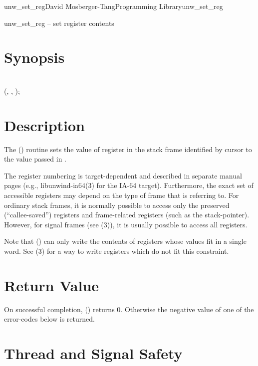\documentclass{article}
\begin{document}
\begin{Name}{3}{unw\_set\_reg}{David Mosberger-Tang}{Programming Library}{unw\_set\_reg}

  unw\_set\_reg -- set register contents
\end{Name}

\section{Synopsis}

\\

 (,  ,  );\\

\section{Description}

The () routine sets the value of register
 in the stack frame identified by cursor  to the
value passed in .

The register numbering is target-dependent and described in separate
manual pages (e.g., libunwind-ia64(3) for the IA-64 target).
Furthermore, the exact set of accessible registers may depend on the
type of frame that  is referring to.  For ordinary stack
frames, it is normally possible to access only the preserved
(``callee-saved'') registers and frame-related registers (such as the
stack-pointer).  However, for signal frames (see
(3)), it is usually possible to access
all registers.

Note that () can only write the contents of
registers whose values fit in a single word.  See
(3) for a way to write registers which do not
fit this constraint.

\section{Return Value}

On successful completion, () returns 0.
Otherwise the negative value of one of the error-codes below is
returned.

\section{Thread and Signal Safety}
\end{document}
